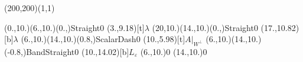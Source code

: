 \unitlength=1bp%

\begin{feynartspicture}(200,200)(1,1)

\FADiagram{}
\FAProp(0.,10.)(6.,10.)(0.,){Straight}{0}
\FALabel(3.,9.18)[t]{$\lambda$}
\FAProp(20,10.)(14.,10.)(0.,){Straight}{0}
\FALabel(17.,10.82)[b]{$\lambda$}
\FAProp(6.,10.)(14.,10.)(0.8,){ScalarDash}{0}
\FALabel(10.,5.98)[t]{$A|_{W^\perp}$}
\FAProp(6.,10.)(14.,10.)(-0.8,){BandStraight}{0}
\FALabel(10.,14.02)[b]{$L_\varepsilon$}
\FAVert(6.,10.){0}
\FAVert(14.,10.){0}
\end{feynartspicture}


